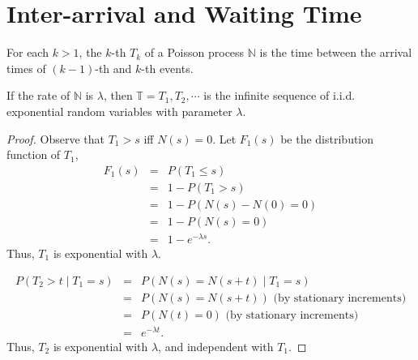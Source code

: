 \section{Inter-arrival and Waiting Time}

\begin{definition}
For each $ k > 1 $, the $ k $-th  $ T_{k} $ of a Poisson process $ \mathbb{N} $ is the time between the arrival times of $ (k - 1) $-th and $ k $-th events.
\end{definition}

\begin{observation} \label{obs:exp_with_lambda}
If the rate of $ \mathbb{N} $ is $ \lambda $, then $ \mathbb{T} = T_{1}, T_{2}, \cdots $ is the infinite sequence of i.i.d. exponential random variables with parameter $ \lambda $.

\begin{proof}
Observe that $ T_{1} > s $ iff $ N(s) = 0 $. Let $ F_{1}(s) $ be the distribution function of $ T_{1} $,
\begin{eqnarray*}
F_{1}(s)
  & = & P(T_{1} \le s) \\
  & = & 1 - P(T_{1} > s) \\
  & = & 1 - P(N(s) - N(0) = 0) \\
  & = & 1 - P(N(s) = 0) \\
  & = & 1 - e^{-\lambda s}.
\end{eqnarray*}
Thus, $ T_{1} $ is exponential with $ \lambda $.

\begin{eqnarray*}
P(T_{2} > t \mid T_{1} = s)
  & = & P(N(s) = N(s + t) \mid T_{1} = s) \\
  & = & P(N(s) = N(s + t)) \text{ (by stationary increments)} \\
  & = & P(N(t) = 0) \text{ (by stationary increments)} \\
  & = & e^{-\lambda t}.
\end{eqnarray*}
Thus, $ T_{2} $ is exponential with $ \lambda $, and independent with $ T_{1} $.
\end{proof}
\end{observation}

